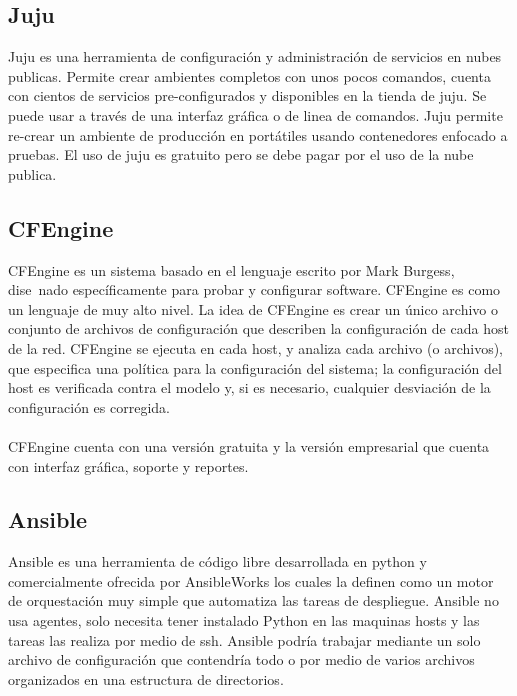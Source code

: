 \subsection{Juju}
Juju \cite{juju16} es una herramienta de configuración y administración de servicios en nubes publicas. Permite crear ambientes completos con unos pocos comandos, cuenta con cientos de servicios pre-configurados y disponibles en la tienda de juju. Se puede usar a través de una interfaz gráfica o de linea de comandos. Juju permite re-crear un ambiente de producción en portátiles usando contenedores enfocado a pruebas. El uso de juju es gratuito pero se debe pagar por el uso de la nube publica.

\subsection{CFEngine}
CFEngine es un sistema basado en el lenguaje escrito por Mark Burgess, dise~nado específicamente para probar y configurar software. CFEngine es como un lenguaje de muy alto nivel. La idea de CFEngine es crear un único archivo o conjunto de archivos de configuración que describen la configuración de cada host de la red. CFEngine se ejecuta en cada host, y analiza cada archivo (o archivos), que especifica una política para la configuración del sistema; la configuración del host es verificada contra el modelo y, si es necesario, cualquier desviación de la configuración es corregida. \cite{cfengine15}\\
\\
CFEngine cuenta con una versión gratuita y la versión empresarial que cuenta con interfaz gráfica, soporte y reportes.

\subsection{Ansible}
Ansible \cite{ans16} es una herramienta de código libre desarrollada en python y comercialmente ofrecida por AnsibleWorks los cuales la definen como un motor de orquestación muy simple que automatiza las tareas de despliegue. Ansible no usa agentes, solo necesita tener instalado Python en las maquinas hosts y las tareas las realiza por medio de ssh. Ansible podría trabajar mediante un solo archivo de configuración que contendría todo o por medio de varios archivos organizados en una estructura de directorios. 

